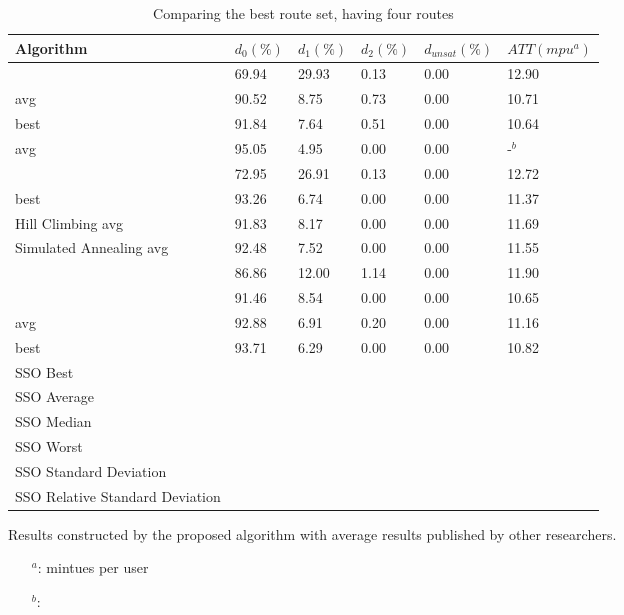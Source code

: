 \begin{table}[H]
	\centering
    \hspace*{-2.0cm}
    \begin{tabular}{|l||l|l|l|l|l|}
 	\hline
 	Algorithm & $d_0(\%)$ & $d_1(\%)$ & $d_2(\%)$ & $d_{unsat}(\%)$ & $ATT(mpu^a)$ \\
 	\hline
    \citet{mandl79} & 69.94 & 29.93 & 0.13 & 0.00 & 12.90 \\
    \citet{kechagiopoulos14} avg & 90.52 & 8.75 & 0.73 & 0.00 & 10.71 \\
    \citet{kechagiopoulos14} best & 91.84 & 7.64 & 0.51 & 0.00 & 10.64 \\
    \citet{nikolic14} avg & 95.05 & 4.95 & 0.00 & 0.00 & -$^b$ \\
    \citet{kidwai98} & 72.95 & 26.91 & 0.13 & 0.00 & 12.72 \\
    \citet{fan10} best & 93.26 & 6.74 & 0.00 & 0.00 & 11.37 \\
    \citet{fan10} Hill Climbing avg & 91.83 & 8.17 & 0.00 & 0.00 & 11.69 \\
    \citet{fan10} Simulated Annealing avg & 92.48 & 7.52 & 0.00 & 0.00 & 11.55 \\
    \citet{chakroborty02} & 86.86 & 12.00 & 1.14 & 0.00 & 11.90 \\
    \citet{zhang10} & 91.46 & 8.54 & 0.00 & 0.00 & 10.65 \\
    \citet{chew12} avg & 92.88 & 6.91 & 0.20 & 0.00 & 11.16 \\
    \citet{chew12} best & 93.71 & 6.29 & 0.00 & 0.00 & 10.82 \\
	\hline
    \hline
    SSO Best & ~ & ~ & ~ & ~ & ~ \\
    SSO Average & ~ & ~ & ~ & ~ & ~ \\
    SSO Median & ~ & ~ & ~ & ~ & ~ \\
    SSO Worst & ~ & ~ & ~ & ~ & ~ \\
    SSO Standard Deviation & ~ & ~ & ~ & ~ & ~ \\
    SSO Relative Standard Deviation & ~ & ~ & ~ & ~ & ~ \\
    \hline
    \end{tabular}
    \caption {Comparing the best route set, having four routes}
    Results constructed by the proposed algorithm with average results published by other researchers.
    \begin{itemize}[noitemsep]
    \item[$^a$:] mintues per user
    \item[$^b$:] 
    \end{itemize}
    \label{table:performanceComparison_4}
	\end{table}


